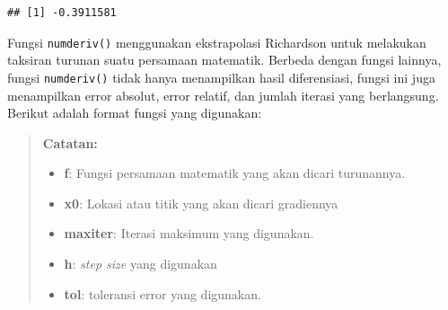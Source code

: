 \documentclass[]{book}
\newenvironment{Shaded}{\begin{snugshade}}{\end{snugshade}}
\newcommand{\CommentTok}[1]{\textcolor[rgb]{0.56,0.35,0.01}{\textit{#1}}}
\newcommand{\ControlFlowTok}[1]{\textcolor[rgb]{0.13,0.29,0.53}{\textbf{#1}}}
\newcommand{\DataTypeTok}[1]{\textcolor[rgb]{0.13,0.29,0.53}{#1}}
\newcommand{\DecValTok}[1]{\textcolor[rgb]{0.00,0.00,0.81}{#1}}
\newcommand{\KeywordTok}[1]{\textcolor[rgb]{0.13,0.29,0.53}{\textbf{#1}}}
\newcommand{\NormalTok}[1]{#1}
\newcommand{\OperatorTok}[1]{\textcolor[rgb]{0.81,0.36,0.00}{\textbf{#1}}}
\newcommand{\StringTok}[1]{\textcolor[rgb]{0.31,0.60,0.02}{#1}}
\providecommand{\tightlist}{%
  \setlength{\itemsep}{0pt}\setlength{\parskip}{0pt}}
\theoremstyle{definition}
\theoremstyle{definition}
\theoremstyle{definition}
\theoremstyle{remark}
\begin{document}
\begin{Shaded}
\end{Shaded}

\begin{verbatim}
## [1] -0.3911581
\end{verbatim}

Fungsi \texttt{numderiv()} menggunakan ekstrapolasi Richardson untuk melakukan taksiran turunan suatu persamaan matematik. Berbeda dengan fungsi lainnya, fungsi \texttt{numderiv()} tidak hanya menampilkan hasil diferensiasi, fungsi ini juga menampilkan error absolut, error relatif, dan jumlah iterasi yang berlangsung. Berikut adalah format fungsi yang digunakan:

\begin{Shaded}
\end{Shaded}

\begin{quote}
\textbf{Catatan:}

\begin{itemize}
\tightlist
\item
  \textbf{f}: Fungsi persamaan matematik yang akan dicari turunannya.
\item
  \textbf{x0}: Lokasi atau titik yang akan dicari gradiennya
\item
  \textbf{maxiter}: Iterasi maksimum yang digunakan.
\item
  \textbf{h}: \emph{step size} yang digunakan
\item
  \textbf{tol}: toleransi error yang digunakan.
\end{itemize}
\end{quote}
\end{document}
